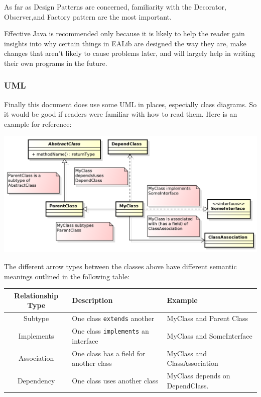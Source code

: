 \documentclass[11pt,letterpaper,oneside]{article}
\begin{document}
As far as Design Patterns are concerned, familiarity with the Decorator, Observer,and Factory pattern are the most important.

Effective Java is recommended only because it is likely to help the reader gain insights into why certain things in EALib are designed the way they are, make changes that aren't likely to cause problems later, and will largely help in writing their own programs in the future.

\subsubsection{UML}

Finally this document does use some UML in places, especially class diagrams. So it would be good if readers were familiar with how to read them. Here is an example for reference:

\begin{center}
\includegraphics[scale=0.65]{img/UML/ClassDiagram.png}
\end{center}

The different arrow types between the classes above have different semantic meanings outlined in the following table:

\begin{tabular}{c | l | l}
Relationship Type & Description & Example\\
\hline
\hline
Subtype & One class \texttt{extends} another & MyClass and Parent Class\\
Implements & One class \texttt{implements} an interface & MyClass and SomeInterface\\
Association & One class has a field for another class & MyClass and ClassAssociation\\
Dependency & One class uses another class & MyClass depends on DependClass.\\
\hline
\end{tabular}
~\\~
\\
\end{document}

